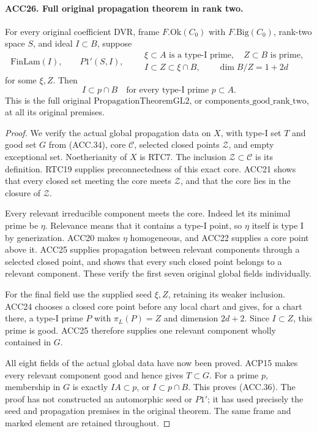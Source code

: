 \paragraph{ACC26. Full original propagation theorem in rank two.}
\label{claim:ACC26}
For every original coefficient DVR, frame \(F.\mathrm{Ok}(C_0)\)
with \(F.\mathrm{Big}(C_0)\), rank-two space \(S\), and
ideal \(I\subset B\), suppose
\[
 \mathrm{FinLam}(I),\qquad P1'(S,I),\qquad
 \begin{gathered}
 \xi\subset A\text{ is a type-I prime},\quad Z\subset B\text{ is prime},\\
 I\subset Z\subset\xi\cap B,\qquad \dim B/Z=1+2d
 \end{gathered}                                             \tag{ACC.35}
\]
for some \(\xi,Z\).  Then
\[
             I\subset p\cap B
       \quad\text{for every type-I prime }p\subset A.     \tag{ACC.36}
\]
This is the full original \(\mathrm{PropagationTheoremGL2}\),
or \(\mathrm{components\_good\_rank\_two}\), at all its
original premises.

\begin{proof}
We verify the actual global propagation data on \(X\), with
type-I set \(T\) and good set \(G\) from (ACC.34), core
\(\mathcal C\), selected closed points \(\mathcal Z\), and
empty exceptional set.  Noetherianity of \(X\) is RTC7.
The inclusion \(\mathcal Z\subset\mathcal C\) is its definition.
RTC19 supplies preconnectedness of this exact core.  ACC21 shows
that every closed set meeting the core meets \(\mathcal Z\),
and that the core lies in the closure of \(\mathcal Z\).

Every relevant irreducible component meets the core.  Indeed let
its minimal prime be \(\eta\).  Relevance means that it contains
a type-I point, so \(\eta\) itself is type I by generization.
ACC20 makes \(\eta\) homogeneous, and ACC22 supplies a core
point above it.  ACC25 supplies propagation between relevant
components through a selected closed point, and shows that every
such closed point belongs to a relevant component.  These verify
the first seven original global fields individually.

For the final field use the supplied seed \(\xi,Z\), retaining
its weaker inclusion.  ACC24 chooses a closed core point before
any local chart and gives, for a chart there, a type-I prime \(P\)
with \(\pi_L(P)=Z\) and dimension \(2d+2\).  Since
\(I\subset Z\), this prime is good.  ACC25 therefore supplies
one relevant component wholly contained in \(G\).

All eight fields of the actual global data have now been proved.
ACP15 makes every relevant component good and hence gives
\(T\subset G\).  For a prime \(p\), membership in \(G\)
is exactly \(IA\subset p\), or \(I\subset p\cap B\).
This proves (ACC.36).  The proof has not constructed an automorphic
seed or \(P1'\); it has used precisely the seed and propagation
premises in the original theorem.  The same frame and marked
element are retained throughout.
\end{proof}

